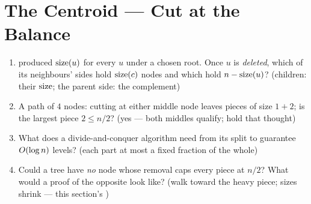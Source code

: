 \section{The Centroid --- Cut at the Balance}\label{sec:c09-centroid}

\begin{previouslybox}
\begin{enumerate}[nosep, leftmargin=1.6em]
  \item {} produced $\operatorname{size}(u)$ for every $u$ under a chosen root. Once
        $u$ is \emph{deleted}, which of its neighbours' sides hold $\operatorname{size}(c)$ nodes and
        which hold $n-\operatorname{size}(u)$? (children: their $\operatorname{size}$; the parent side: the complement)
  \item A path of $4$ nodes: cutting at either middle node leaves pieces of size $1{+}2$;
        is the largest piece $2 \le n/2$? (yes --- both middles qualify; hold that thought)
  \item What does a divide-and-conquer algorithm need from its split to guarantee
        $O(\log n)$ levels? (each part at most a fixed fraction of the whole)
  \item Could a tree have \emph{no} node whose removal caps every piece at $n/2$? What
        would a proof of the opposite look like? (walk toward the heavy piece; sizes
        shrink --- this section's )
\end{enumerate}
\end{previouslybox}

